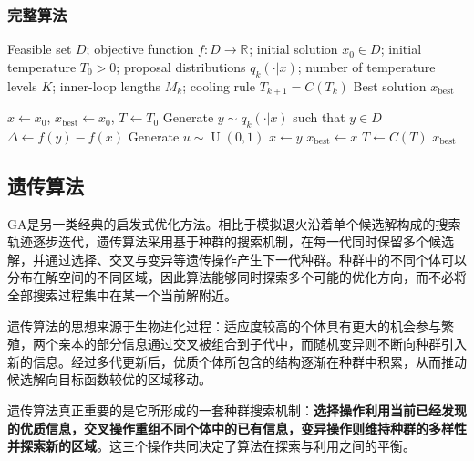 \subsubsection{完整算法}
\begin{algorithm}[H]
	\caption{Simulated Annealing}
	\label{alg:SimulatedAnnealing}
	\begin{algorithmic}[1]
		\Require Feasible set $D$; objective function $f:D\to\mathbb{R}^{}$;
		initial solution $x_0\in D$; initial temperature $T_0>0$;
		proposal distributions $q_k(\cdot|x)$; number of temperature levels $K$;
		inner-loop lengths $M_k$; cooling rule $T_{k+1}=C(T_k)$
		\Ensure Best solution $x_{\mathrm{best}}$

		\State $x\gets x_0$, $x_{\mathrm{best}}\gets x_0$, $T\gets T_0$
				\State Generate $y\sim q_k(\cdot|x)$ such that $y\in D$
				\State $\Delta\gets f(y)-f(x)$
				\State Generate $u\sim\operatorname{U}(0,1)$
					\State $x\gets y$
				\EndIf
					\State $x_{\mathrm{best}}\gets x$
				\EndIf
			\EndFor
			\State $T\gets C(T)$
		\EndFor
		\State \Return $x_{\mathrm{best}}$
	\end{algorithmic}
\end{algorithm}

\subsection{遗传算法}
\gls{GA}是另一类经典的启发式优化方法。相比于模拟退火沿着单个候选解构成的搜索轨迹逐步迭代，遗传算法采用基于种群的搜索机制，在每一代同时保留多个候选解，并通过选择、交叉与变异等遗传操作产生下一代种群。种群中的不同个体可以分布在解空间的不同区域，因此算法能够同时探索多个可能的优化方向，而不必将全部搜索过程集中在某一个当前解附近。\par
遗传算法的思想来源于生物进化过程：适应度较高的个体具有更大的机会参与繁殖，两个亲本的部分信息通过交叉被组合到子代中，而随机变异则不断向种群引入新的信息。经过多代更新后，优质个体所包含的结构逐渐在种群中积累，从而推动候选解向目标函数较优的区域移动。\par
遗传算法真正重要的是它所形成的一套种群搜索机制：\textbf{选择操作利用当前已经发现的优质信息，交叉操作重组不同个体中的已有信息，变异操作则维持种群的多样性并探索新的区域}。这三个操作共同决定了算法在探索与利用之间的平衡。
